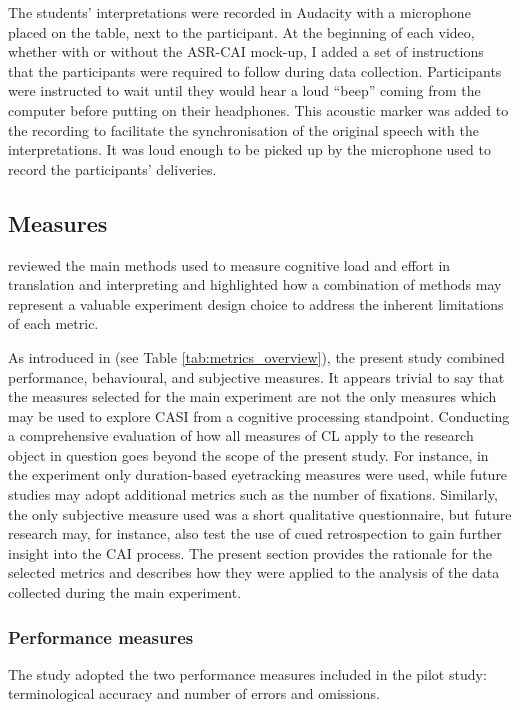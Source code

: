 The students' interpretations were recorded in Audacity with a microphone placed on the table, next to the participant. At the beginning of each video, whether with or without the ASR-CAI mock-up, I added a set of instructions that the participants were required to follow during data collection. Participants were instructed to wait until they would hear a loud ``beep'' coming from the computer before putting on their headphones. This acoustic marker was added to the recording to facilitate the synchronisation of the original speech with the interpretations. It was loud enough to be picked up by the microphone used to record the participants' deliveries.
\subsection{Measures} \label{measures}
 reviewed the main methods used to measure cognitive load and effort in translation and interpreting and highlighted how a combination of methods may represent a valuable experiment design choice to address the inherent limitations of each metric.

As introduced in  (see Table \ref{tab:metrics_overview}), the present study combined performance, behavioural, and subjective measures. It appears trivial to say that the measures selected for the main experiment are not the only measures which may be used to explore CASI from a cognitive processing standpoint. Conducting a comprehensive evaluation of how all measures of CL apply to the research object in question goes beyond the scope of the present study. For instance, in the experiment only duration-based eyetracking measures were used, while future studies may adopt additional metrics such as the number of fixations. Similarly, the only subjective measure used was a short qualitative questionnaire, but future research may, for instance, also test the use of cued retrospection to gain further insight into the CAI process. The present section provides the rationale for the selected metrics and describes how they were applied to the analysis of the data collected during the main experiment.

\subsubsection{Performance measures} \label{performancem}
The study adopted the two performance measures included in the pilot study: terminological accuracy and number of errors and omissions.

